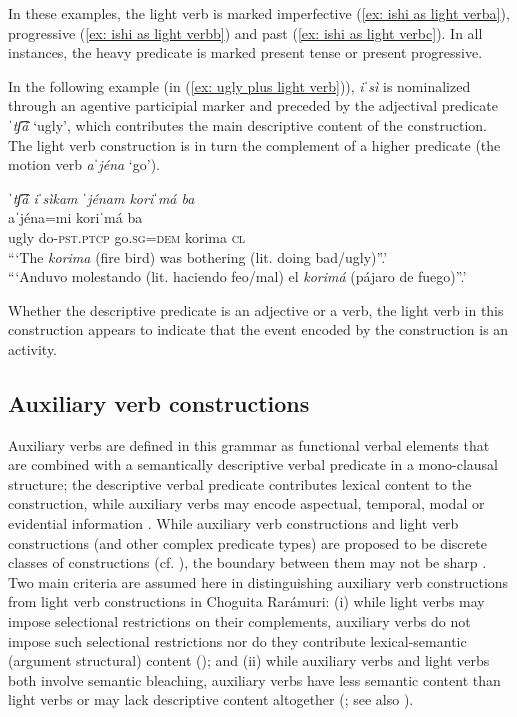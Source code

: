 In these examples, the light verb is marked imperfective (\ref{ex: ishi as light verba}), progressive (\ref{ex: ishi as light verbb}) and past (\ref{ex: ishi as light verbc}). In all instances, the heavy predicate is marked present tense or present progressive.

In the following example (in (\ref{ex: ugly plus light verb})), \textit{iˈsì} is nominalized through an agentive participial marker and preceded by the adjectival predicate \textit{ˈtʃ͡á} ‘ugly’, which contributes the main descriptive content of the construction. The light verb construction is in turn the complement of a higher predicate (the motion verb \textit{aˈjéna} `go').

\ea\label{ex: ugly plus light verb}

\textit{ˈtʃ͡á    iˈsìkam ˈjénam koriˈmá ba}\\
  aˈjéna=mi  koriˈmá    ba\\
        {ugly}   {do-\textsc{pst.ptcp}} go.\textsc{sg=dem} korima   \textsc{cl}\\
\glt    ```The \textit{korima} (fire bird) was bothering (lit. doing bad/ugly)”.'\\
\glt    ```Anduvo molestando (lit. haciendo feo/mal) el \textit{korimá} (pájaro de fuego)”.' \\

\z

Whether the descriptive predicate is an adjective or a verb, the light verb in this construction appears to indicate that the event encoded by the construction is an activity.

\subsection{Auxiliary verb constructions}
\label{subsec: auxiliary verb constructions}

Auxiliary verbs are defined in this grammar as functional verbal elements that are combined with a semantically descriptive verbal predicate in a mono-clausal structure; the descriptive verbal predicate contributes lexical content to the construction, while auxiliary verbs may encode aspectual, temporal, modal or evidential information \citep{anderson2006auxiliary,svenonius2008complex}. While auxiliary verb constructions and light verb constructions (and other complex predicate types) are proposed to be discrete classes of constructions \citep{butt2001semi} (cf. \citealt{anderson2006auxiliary}), the boundary between them may not be sharp \citep{svenonius2008complex}. Two main criteria are assumed here in distinguishing auxiliary verb constructions from light verb constructions in Choguita Rarámuri: (i) while light verbs may impose selectional restrictions on their complements, auxiliary verbs  do not impose such selectional restrictions nor do they contribute lexical-semantic (argument structural) content (\citealt{butt1995structure}); and (ii) while auxiliary verbs and light verbs both involve semantic bleaching, auxiliary verbs have less semantic content than light verbs or may lack descriptive content altogether (\citealt{butt1995structure}; see also \citealt{tubino2014affixal}).


